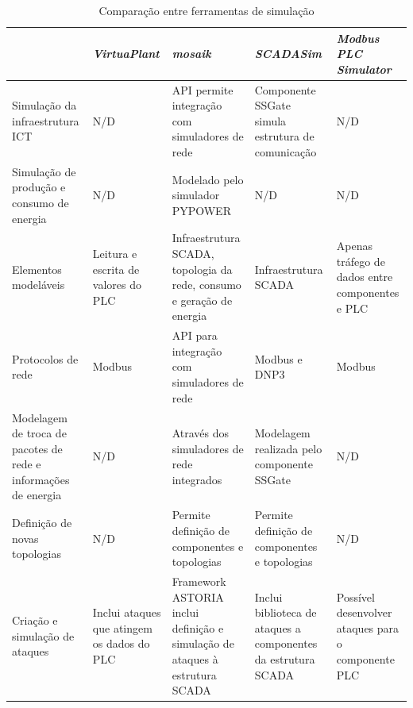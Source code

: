 \documentclass[cic,tc]{iiufrgs}
\begin{document}
\begin{table}[h]
    \caption{Comparação entre ferramentas de simulação}
    \centering
    \scriptsize
        \begin{tabular}{m{2.4cm}|m{2.4cm}|m{2.4cm}|m{2.4cm}|m{2.4cm}}
          \hline
           & \textit{VirtuaPlant} & \textit{mosaik} & \textit{SCADASim} & \textit{Modbus PLC Simulator} \\
          \hline
          \hline
          Simulação da infraestrutura ICT & N/D & API permite integração com simuladores de rede & Componente SSGate simula estrutura de comunicação & N/D \\
          \hline
          Simulação de produção e consumo de energia & N/D & Modelado pelo simulador PYPOWER & N/D & N/D \\
          \hline
          Elementos modeláveis & Leitura e escrita de valores do PLC & Infraestrutura SCADA, topologia da rede, consumo e geração de energia & Infraestrutura SCADA & Apenas tráfego de dados entre componentes e PLC \\
          \hline 
          Protocolos de rede & Modbus & API para integração com simuladores de rede & Modbus e DNP3 & Modbus \\
          \hline
          Modelagem de troca de pacotes de rede e informações de energia & N/D & 	Através dos simuladores de rede integrados & Modelagem realizada pelo componente SSGate & N/D \\
          \hline
          Definição de novas topologias & N/D & Permite definição de componentes e topologias & Permite definição de componentes e topologias & N/D \\
          \hline
          Criação e simulação de ataques & Inclui ataques que atingem os dados do PLC & Framework ASTORIA inclui definição e simulação de ataques à estrutura SCADA & Inclui biblioteca de ataques a componentes da estrutura SCADA & Possível desenvolver ataques para o componente PLC \\
          \hline
        \end{tabular}
    \label{tbl:comparacaosim}
\end{table}
\end{document}
